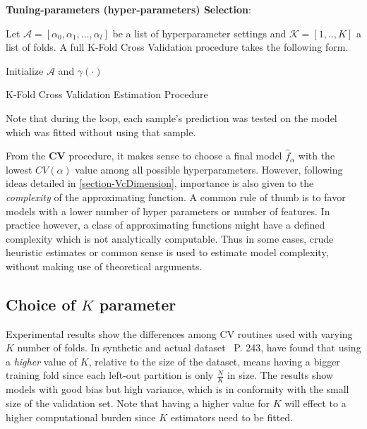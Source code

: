 \textbf{Tuning-parameters (hyper-parameters) Selection}:

 Let $\mathcal{A} = [\alpha_0, \alpha_1,\ldots, \alpha_l  ]$ be a list of hyperparameter settings and $\mathcal{K} =[1,..,K]$ a list of folds. A full K-Fold Cross Validation procedure takes the following form.

 \begin{algorithm}%
 \SetAlgoLined{}
 Initialize $\mathcal{A}$ and $\gamma(\cdot)$\;
 \caption{K-Fold Cross Validation Estimation Procedure}
 \end{algorithm}

Note that during the loop, each sample's prediction was tested on the model which was fitted without using that sample.

From the \textbf{CV} procedure, it makes sense to choose a final model $\hat{f}_\alpha$ with the lowest $CV(\alpha)$ value among all possible hyperparameters. However, following ideas detailed in \cref{section-VcDimension}, importance is also given to the \textit{complexity} of the approximating function. A common rule of thumb is to favor models with a lower number of hyper parameters or number of features. In practice however, a class of approximating functions might have a defined complexity which is not analytically computable. Thus in some cases, crude heuristic estimates or common sense is used to estimate model complexity, without making use of theoretical arguments.


\subsection{Choice of \texorpdfstring{$K$ parameter}{Lg} }

 Experimental results show the differences among CV routines used with varying $K$ number of folds. In synthetic and actual dataset~\textcite{hastie-elemstatslearn} P. 243, have found that using a \textit{higher} value of $K$, relative to the size of the dataset, means having a bigger training fold since each left-out partition is only $\frac{N}{K}$ in size. The results show models with good bias but high variance, which is in conformity with the small size of the validation set. Note that having a higher value for $K$ will effect to a higher computational burden since $K$ estimators need to be fitted.

